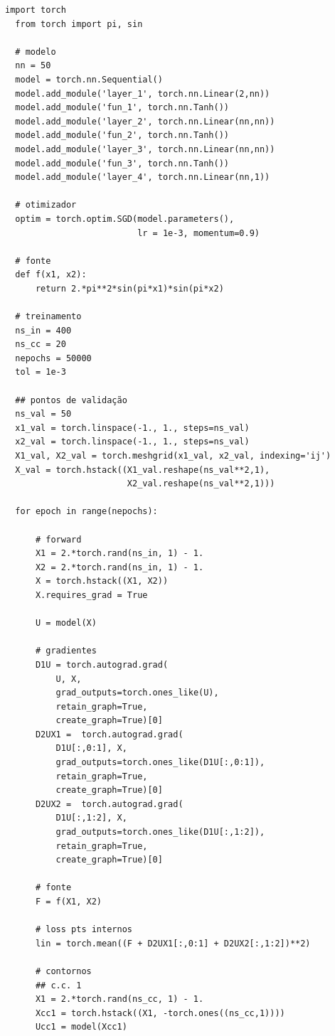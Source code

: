 \begin{lstlisting}[caption=py\_pinn\_poisson]
  import torch
  from torch import pi, sin
  
  # modelo
  nn = 50
  model = torch.nn.Sequential()
  model.add_module('layer_1', torch.nn.Linear(2,nn))
  model.add_module('fun_1', torch.nn.Tanh())
  model.add_module('layer_2', torch.nn.Linear(nn,nn))
  model.add_module('fun_2', torch.nn.Tanh())
  model.add_module('layer_3', torch.nn.Linear(nn,nn))
  model.add_module('fun_3', torch.nn.Tanh())
  model.add_module('layer_4', torch.nn.Linear(nn,1))
  
  # otimizador
  optim = torch.optim.SGD(model.parameters(),
                          lr = 1e-3, momentum=0.9)
  
  # fonte
  def f(x1, x2):
      return 2.*pi**2*sin(pi*x1)*sin(pi*x2)
  
  # treinamento
  ns_in = 400
  ns_cc = 20
  nepochs = 50000
  tol = 1e-3
  
  ## pontos de validação
  ns_val = 50
  x1_val = torch.linspace(-1., 1., steps=ns_val)
  x2_val = torch.linspace(-1., 1., steps=ns_val)
  X1_val, X2_val = torch.meshgrid(x1_val, x2_val, indexing='ij')
  X_val = torch.hstack((X1_val.reshape(ns_val**2,1),
                        X2_val.reshape(ns_val**2,1)))
  
  for epoch in range(nepochs):
      
      # forward
      X1 = 2.*torch.rand(ns_in, 1) - 1.
      X2 = 2.*torch.rand(ns_in, 1) - 1.
      X = torch.hstack((X1, X2))
      X.requires_grad = True
      
      U = model(X)
      
      # gradientes
      D1U = torch.autograd.grad(
          U, X,
          grad_outputs=torch.ones_like(U),
          retain_graph=True,
          create_graph=True)[0]
      D2UX1 =  torch.autograd.grad(
          D1U[:,0:1], X,
          grad_outputs=torch.ones_like(D1U[:,0:1]),
          retain_graph=True,
          create_graph=True)[0]
      D2UX2 =  torch.autograd.grad(
          D1U[:,1:2], X,
          grad_outputs=torch.ones_like(D1U[:,1:2]),
          retain_graph=True,
          create_graph=True)[0]
      
      # fonte
      F = f(X1, X2)
      
      # loss pts internos
      lin = torch.mean((F + D2UX1[:,0:1] + D2UX2[:,1:2])**2)
      
      # contornos
      ## c.c. 1
      X1 = 2.*torch.rand(ns_cc, 1) - 1.
      Xcc1 = torch.hstack((X1, -torch.ones((ns_cc,1))))
      Ucc1 = model(Xcc1)
      

\end{lstlisting}
